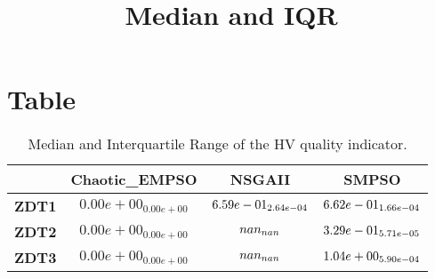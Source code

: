 \documentclass{article}
\title{Median and IQR}
\author{}
\begin{document}
\maketitle
\section{Table}
\begin{table}[!htp]
  \caption{Median and Interquartile Range of the HV quality indicator.}
  \label{table:HV}
  \centering
  \begin{scriptsize}
  \begin{tabular}{c|ccc}
      & \textbf{Chaotic\_EMPSO} & \textbf{NSGAII} & \textbf{SMPSO} \\\hline
      \textbf{ZDT1} & $0.00e+00_{0.00e+00} $ & $ \cellcolor{gray25} 6.59e-01_{2.64e-04} $ & $ \cellcolor{gray95} 6.62e-01_{1.66e-04}$ \\
      \textbf{ZDT2} & $0.00e+00_{0.00e+00} $ & $ \cellcolor{gray25} nan_{nan} $ & $ \cellcolor{gray95} 3.29e-01_{5.71e-05}$ \\
      \textbf{ZDT3} & $0.00e+00_{0.00e+00} $ & $ \cellcolor{gray25} nan_{nan} $ & $ \cellcolor{gray95} 1.04e+00_{5.90e-04}$ \\
  \end{tabular}
  \end{scriptsize}
\end{table}
\end{document}
